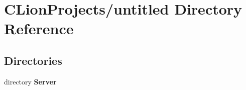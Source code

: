 \section{C\+Lion\+Projects/untitled Directory Reference}
\label{dir_bf01346f52fb04ff7f6f24d83732c6ad}
\subsection*{Directories}
\begin{DoxyCompactItemize}
\item 
directory \textbf{ Server}
\end{DoxyCompactItemize}
